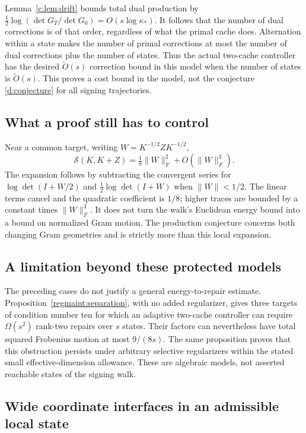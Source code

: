 \documentclass[11pt]{amsart}
\theoremstyle{definition}\newtheorem{definition}[theorem]{Definition}
\theoremstyle{remark}\newtheorem{remark}[theorem]{Remark}
\numberwithin{equation}{section}
\begin{document}
Lemma~\ref{c:lem:drift} bounds total dual production by
$\tfrac12\log(\det G_T/\det G_0)=O(s\log\kappa_*)$.
It follows that the number of dual corrections is of that order, regardless
of what the primal cache does. Alternation within a state makes the number
of primal corrections at most the number of dual corrections plus the
number of states. Thus the actual two-cache controller has the desired
$\widetilde O(s)$ correction bound in this model when the number of states is
$\widetilde O(s)$. This proves a cost bound in the model, not
the conjecture \eqref{d:conjecture} for all signing trajectories.

\subsection{What a proof still has to control}
Near a common target, writing $W=K^{-1/2}ZK^{-1/2}$,
\[
 \mathcal{S}(K,K+Z)=\tfrac18\|W\|_F^2+O(\|W\|_F^3).
\]
The expansion follows by subtracting the convergent series for
$\log\det(I+W/2)$ and $\tfrac12\log\det(I+W)$ when $\|W\|<1/2$.
The linear terms cancel and the quadratic coefficient is $1/8$; higher
traces are bounded by a constant times $\|W\|_F^3$. It does not turn the
walk's Euclidean energy bound into a bound on normalized Gram motion.
The production conjecture concerns both changing Gram geometries and is
strictly more than this local expansion.


\subsection{A limitation beyond these protected models}
The preceding cases do not justify a general energy-to-repair estimate.
Proposition~\ref{regmaint:separation}, with no added regularizer, gives
three targets of condition number ten for which an adaptive two-cache
controller can require $\Omega(s^2)$ rank-two repairs over $s$ states.
Their factors can nevertheless have total squared Frobenius motion at
most $9/(8s)$. The same proposition proves that this obstruction persists
under arbitrary selective regularizers within the stated small
effective-dimension allowance. These are algebraic models, not asserted
reachable states of the signing walk.


\subsection{Wide coordinate interfaces in an admissible local state}\label{ifc:sec:wideinterfaces}
\end{document}
